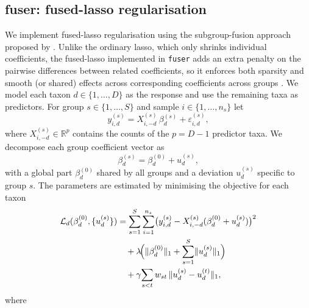 \documentclass[]{Liebert_Author_revised}
\providecommand{\DIFadd}[1]{{\ifmmode\else\leavevmode\fi\color{blue}#1}} %
\providecommand{\DIFaddbegin}{} %
\providecommand{\DIFaddend}{} %
\begin{document}
\subsection{fuser: fused-lasso regularisation}
We implement fused-lasso regularisation using the subgroup-fusion approach proposed by \citet{dondelinger2016hdlss}.
Unlike the ordinary lasso, which only shrinks individual coefficients, the fused-lasso implemented in \texttt{fuser} adds an extra penalty on the pairwise differences between related coefficients, so it enforces both sparsity and smooth (or shared) effects across  \DIFaddbegin \DIFadd{corresponding coefficients across groups }\DIFaddend \citep{tibshirani2005fused,dondelinger2016hdlss,fuser2025}.
We model each taxon $d\in\{1,\dots,D\}$ as the response and use the remaining taxa as predictors.
For  \DIFaddbegin \DIFadd{group
}\DIFaddend $s\in\{1,\dots,S\}$ and sample $i\in\{1,\dots,n_s\}$ let
\[
y_{i,d}^{(s)} = X_{i,-d}^{(s)} \,\beta_{d}^{(s)} + \varepsilon_{i,d}^{(s)},
\]
where $X_{i,-d}^{(s)}\in\mathbb{R}^{p}$ contains the counts of the
$p=D-1$ predictor taxa. We decompose each  \DIFaddbegin \DIFadd{group }\DIFaddend coefficient vector as
\[
\beta_{d}^{(s)} = \beta_{d}^{(0)} + u_{d}^{(s)},
\]
with a global part $\beta_{d}^{(0)}$ shared by all  \DIFaddbegin \DIFadd{groups }\DIFaddend and a
deviation $u_{d}^{(s)}$ specific to  \DIFaddbegin \DIFadd{group }\DIFaddend $s$.
The parameters are estimated by minimising the  \DIFaddbegin \DIFadd{objective for each taxon
}\DIFaddend \[
\begin{aligned}
\mathcal{L}_{d}(\beta_{d}^{(0)},\{u_{d}^{(s)}\}) &= \sum_{s=1}^{S}\sum_{i=1}^{n_s}
  \bigl(y_{i,d}^{(s)} - X_{i,-d}^{(s)}(\beta_{d}^{(0)} + u_{d}^{(s)})\bigr)^{2} \\
&\quad + \lambda\!\Bigl(\lVert\beta_{d}^{(0)}\rVert_{1}
      + \sum_{s=1}^{S}\lVert u_{d}^{(s)}\rVert_{1}\Bigr) \\
&\quad + \gamma\!\sum_{s<t} w_{st}\,
      \lVert u_{d}^{(s)} - u_{d}^{(t)}\rVert_{1},
\end{aligned}
\]
where
\end{document}
